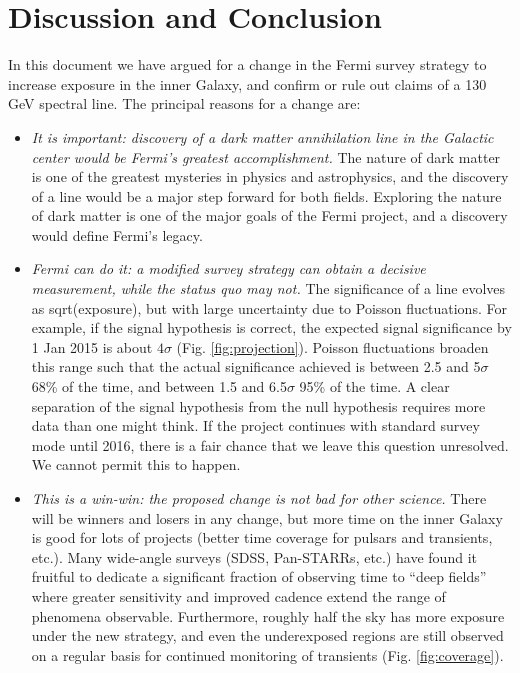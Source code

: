\documentclass[aps,prd,superscriptaddress,nofootinbib,fixlfloat, 12pt]{revtex4-1}
\begin{document}
\section{Discussion and Conclusion}
\label{sec:Conclusion}

In this document we have argued for a change in the Fermi survey strategy to
increase exposure in the inner Galaxy, and confirm or rule out claims of a 130
GeV spectral line.  The principal reasons for a change are:

\begin{itemize}

\item{\it It is important: discovery of a dark matter annihilation line in the
    Galactic center would be Fermi's greatest accomplishment.}  The nature of
  dark matter is one of the greatest mysteries in physics and astrophysics,
  and the discovery of a line would be a major step forward for both fields.
  Exploring the nature of dark matter is one of the major goals of the Fermi
  project, and a discovery would define Fermi's legacy.

\item{\it Fermi can do it: a modified survey strategy can obtain a decisive
    measurement, while the status quo may not.}  The significance of a line
  evolves as sqrt(exposure), but with large uncertainty due to Poisson
  fluctuations.  For example, if the signal hypothesis is correct, the
  expected signal significance by 1 Jan 2015 is about $4\sigma$
  (Fig. \ref{fig:projection}).  Poisson fluctuations broaden this range such
  that the actual significance achieved is between 2.5 and
  5$\sigma$ 68\% of the time, and between 1.5 and 6.5$\sigma$ 95\% of the
  time.  A clear separation of the signal hypothesis from the null hypothesis
  requires more data than one might think.  If the project continues with
  standard survey mode until 2016, there is a fair chance that we leave this
  question unresolved.  We cannot permit this to happen.

\item{\it This is a win-win: the proposed change is not bad for other science.}  There will be winners and
  losers in any change, but more time on the inner Galaxy is good for lots of
  projects (better time coverage for pulsars and transients, etc.).  Many
  wide-angle surveys (SDSS, Pan-STARRs, etc.) have found it fruitful to
  dedicate a significant fraction of observing time to ``deep fields'' where
  greater sensitivity and improved cadence extend the range of phenomena
  observable.  Furthermore, roughly half
  the sky has more exposure under the new strategy, and even the underexposed
  regions are still observed on a regular basis for continued monitoring of
  transients (Fig. \ref{fig:coverage}).

\end{itemize}
\end{document}
